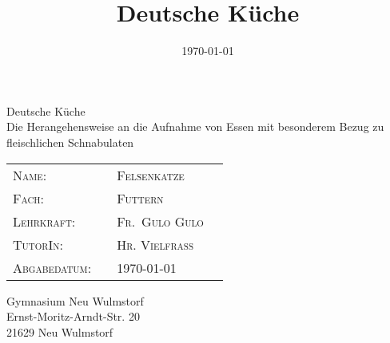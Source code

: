 \documentclass[12pt, a4paper]{article}
\title{Deutsche Küche}
\author{Felsenkatze\and}
\date{\today}
\renewcommand{\thesection}{\arabic{section}.}
\renewcommand{\thesubsection}{\thesection\arabic{subsection}}
\begin{document}
\onehalfspacing %

\pagestyle{plain}
\vspace*{2cm}

\begin{center}
  {\huge Deutsche Küche}\\[1cm]
  {\LARGE Die Herangehensweise an die Aufnahme von Essen mit besonderem
Bezug zu fleischlichen Schnabulaten}\\[5cm]
\end{center}

\vspace*{2cm}

\begin{tabular}{p{3.5cm}|p{0.1cm} p{10cm}l}
  \textsc{Name:}                   &  & \textsc{Felsenkatze}   \\
  \textsc{Fach:}      &  & \textsc{Futtern}  \\ 
  
  
  
  \textsc{Lehrkraft:} &  & \textsc{Fr.~Gulo Gulo}  \\ 
  \textsc{TutorIn:}     &  & \textsc{Hr. Vielfraß}    \\ 
  \textsc{Abgabedatum:}  &  & \textsc{\today}     \\ 
\end{tabular}

\vspace*{4cm}

\begin{center}
  Gymnasium Neu Wulmstorf \\Ernst-Moritz-Arndt-Str. 20 \\21629 Neu
Wulmstorf \\
\end{center}
\clearpage
\pagestyle{school}

\startcontents
\pagestyle{plain}
\clearpage
\pagestyle{school}

\nocite{*}

\blinddocument

\clearpage
\startcontents[appendix]
\stopcontents
\clearpage
\renewcommand{\thesubsection}{A\arabic{subsection}}

\stopcontents[appendix]
\resumecontents
\end{document}

